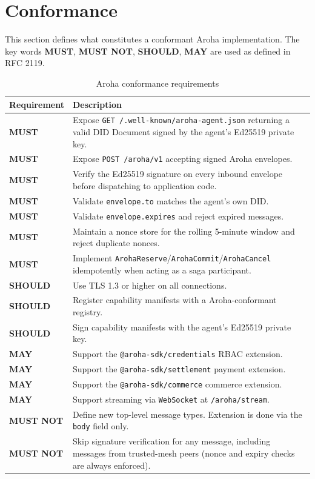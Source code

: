 \documentclass[11pt,a4paper]{article}
\begin{document}
\section{Conformance}

This section defines what constitutes a conformant Aroha implementation.
The key words \textbf{MUST}, \textbf{MUST NOT}, \textbf{SHOULD}, \textbf{MAY}
are used as defined in RFC 2119.

\begin{table}[ht]
  \centering
  \renewcommand{\arraystretch}{1.5}
  \begin{tabularx}{\textwidth}{@{} >{\bfseries}l X @{}}
    \toprule
    Requirement & Description \\
    \midrule
    MUST
      & Expose \texttt{GET /.well-known/aroha-agent.json} returning a valid
        DID Document signed by the agent's Ed25519 private key. \\
    MUST
      & Expose \texttt{POST /aroha/v1} accepting signed Aroha envelopes. \\
    MUST
      & Verify the Ed25519 signature on every inbound envelope before dispatching
        to application code. \\
    MUST
      & Validate \texttt{envelope.to} matches the agent's own DID. \\
    MUST
      & Validate \texttt{envelope.expires} and reject expired messages. \\
    MUST
      & Maintain a nonce store for the rolling 5-minute window and reject
        duplicate nonces. \\
    MUST
      & Implement \texttt{ArohaReserve}/\texttt{ArohaCommit}/\texttt{ArohaCancel}
        idempotently when acting as a saga participant. \\
    SHOULD
      & Use TLS 1.3 or higher on all connections. \\
    SHOULD
      & Register capability manifests with a Aroha-conformant registry. \\
    SHOULD
      & Sign capability manifests with the agent's Ed25519 private key. \\
    MAY
      & Support the \texttt{@aroha-sdk/credentials} RBAC extension. \\
    MAY
      & Support the \texttt{@aroha-sdk/settlement} payment extension. \\
    MAY
      & Support the \texttt{@aroha-sdk/commerce} commerce extension. \\
    MAY
      & Support streaming via \texttt{WebSocket} at \texttt{/aroha/stream}. \\
    MUST NOT
      & Define new top-level message types. Extension is done via the
        \texttt{body} field only. \\
    MUST NOT
      & Skip signature verification for any message, including messages from
        trusted-mesh peers (nonce and expiry checks are always enforced). \\
    \bottomrule
  \end{tabularx}
  \caption{Aroha conformance requirements}
\end{table}
\end{document}
